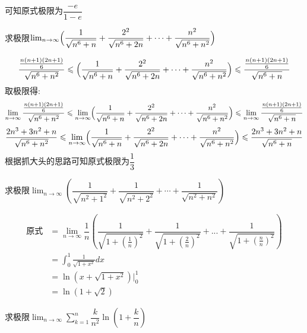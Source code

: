 \documentclass[8pt a4paper, oneside, UTF8]{ctexbook}
\begin{document}
\begin{sloppypar}
\begin{solution}
$$        $$
        可知原式极限为$\dfrac{-e}{1-e}$
    \end{solution}
    \begin{problem}
        求极限$\operatorname*{lim}_{n\to\infty}\Bigl(\dfrac{1}{\sqrt{n^{6}+n}}+\dfrac{2^{2}}{\sqrt{n^{6}+2n}}+\cdots+\dfrac{n^{2}}{\sqrt{n^{6}+n^{2}}}\Bigr)$
    \end{problem}
    \begin{solution}
        $$
            \dfrac{\frac{n(n+1)(2n+1)}6}{\sqrt{n^6+n^2}} \leqslant \Bigl(\dfrac{1}{\sqrt{n^{6}+n}}+\dfrac{2^{2}}{\sqrt{n^{6}+2n}}+\cdots+\dfrac{n^{2}}{\sqrt{n^{6}+n^{2}}}\Bigr) \leqslant \dfrac{\frac{n(n+1)(2n+1)}6}{\sqrt{n^6+n}}
        $$
        取极限得:
        $$
        \lim_{n\to\infty} \dfrac{\frac{n(n+1)(2n+1)}6}{\sqrt{n^6+n^2}} \leqslant  \lim_{n\to\infty} \Bigl(\dfrac{1}{\sqrt{n^{6}+n}}+\dfrac{2^{2}}{\sqrt{n^{6}+2n}}+\cdots+\dfrac{n^{2}}{\sqrt{n^{6}+n^{2}}}\Bigr) \leqslant \lim_{n\to\infty} \dfrac{\frac{n(n+1)(2n+1)}6}{\sqrt{n^6+n}}
        $$
        $$
        \dfrac{2n^3+3n^2+n}{\sqrt{n^6+n^2}} \leqslant \lim_{n\to\infty} \Bigl(\dfrac{1}{\sqrt{n^{6}+n}}+\dfrac{2^{2}}{\sqrt{n^{6}+2n}}+\cdots+\dfrac{n^{2}}{\sqrt{n^{6}+n^{2}}}\Bigr) \leqslant \dfrac{2n^3+3n^2+n}{\sqrt{n^6+n}}
        $$
        根据抓大头的思路可知原式极限为$\dfrac{1}{3}$
    \end{solution}
    \begin{problem}
        求极限$\lim_{n\to\infty}\left(\dfrac{1}{\sqrt{n^{2}+1^{2}}}+\dfrac{1}{\sqrt{n^{2}+2^{2}}}+\cdots+\dfrac{1}{\sqrt{n^{2}+n^{2}}}\right)$
    \end{problem}
    \begin{solution}
        \begin{align*}
          \text{原式} & =\lim_{n \to \infty} \dfrac{1}{n}\left(\dfrac{1}{\sqrt{1+(\frac{1}{n})^2}}+\dfrac{1}{\sqrt{1+(\frac{2}{n})^2}}+...+\dfrac{1}{\sqrt{1+(\frac{n}{n})^2}}\right)\\
          & = \int_{0}^{1}\frac{1}{\sqrt{1+x^{2}}}dx\\
          & = \ln (x+\sqrt{1+x^{2}})|_{0}^{1}\\
          & =\ln(1+\sqrt{2})
        \end{align*}
    \end{solution}
    \begin{problem}
        求极限$\lim_{n\to\infty}\sum_{k=1}^n\dfrac{k}{n^2}\ln\left(1+\dfrac{k}{n}\right)$
    \end{problem}
    \begin{solution}
        \begin{align*}

\end{align*}
\end{solution}
\end{sloppypar}
\end{document}

